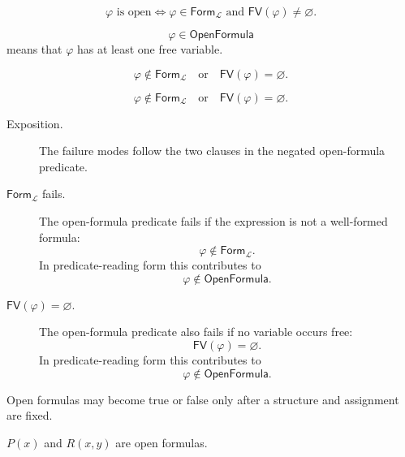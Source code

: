 \begin{remark*}
\[
\varphi \text{ is open}
\Longleftrightarrow
\varphi\in\mathsf{Form}_{\mathcal L}
\text{ and }
\mathsf{FV}(\varphi)\neq\varnothing.
\]
\end{remark*}

\begin{remark*}
\[
  \varphi\in\mathsf{OpenFormula}
\] means that \(\varphi\) has at least one
free variable.
\end{remark*}

\begin{remark*}
\[
\varphi\notin\mathsf{Form}_{\mathcal L}
\quad\text{or}\quad
\mathsf{FV}(\varphi)=\varnothing.
\]
\end{remark*}

\begin{remark*}
\[
\varphi\notin\mathsf{Form}_{\mathcal L}
\quad\text{or}\quad
\mathsf{FV}(\varphi)=\varnothing.
\]
\end{remark*}

\begin{remark*}
\begin{description}
  \item[Exposition.] The failure modes follow the two clauses in the negated
  open-formula predicate.
  \item[\(\mathsf{Form}_{\mathcal L}\) fails.] The open-formula predicate fails
  if the expression is not a well-formed formula:
  \[
  \varphi\notin\mathsf{Form}_{\mathcal L}.
  \]
  In predicate-reading form this contributes to
  \[
  \varphi\notin\mathsf{OpenFormula}.
  \]
  \item[\(\mathsf{FV}(\varphi)=\varnothing\).] The open-formula predicate also
  fails if no variable occurs free:
  \[
  \mathsf{FV}(\varphi)=\varnothing.
  \]
  In predicate-reading form this contributes to
  \[
  \varphi\notin\mathsf{OpenFormula}.
  \]
\end{description}
\end{remark*}

\begin{remark*}[Interpretation]
Open formulas may become true or false only after a structure and assignment
are fixed.
\end{remark*}

\begin{remark*}[Examples]
\(P(x)\) and \(R(x,y)\) are open formulas.
\end{remark*}

